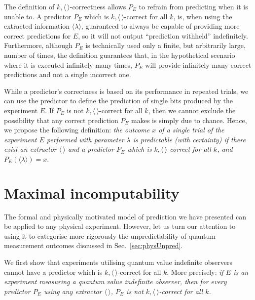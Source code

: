 \documentclass[%
 superscriptaddress,
 preprint,
 showpacs,
 showkeys,
 preprintnumbers,
  amsmath,amssymb,
  aps,
 pra,
  longbibliography,
  floatfix,
 ]{revtex4-1}
\theoremstyle{definition}
\begin{document}
The definition of $k,\langle \, \rangle$-correctness allows $P_E$ to refrain from predicting when it is unable to.
A predictor $P_E$ which is $k,\langle \, \rangle$-correct for all $k$,  is, when using the extracted information $\langle\lambda\rangle$, guaranteed to always be capable of providing more correct predictions for $E$,
so it will not output ``prediction withheld'' indefinitely.
Furthermore, although $P_E$ is technically used only a finite, but arbitrarily large, number of times, the definition guarantees that, in the hypothetical scenario where it is executed infinitely many times, $P_E$ will provide  infinitely many correct predictions and not a single incorrect one.


While a predictor's correctness is based on its performance in repeated trials,  we can use the predictor to define the prediction of single bits produced by the experiment $E$.
If $P_E$ is not $k,\langle \, \rangle$-correct for all $k$, then we cannot exclude the possibility that any correct prediction $P_E$ makes is simply due to chance.
Hence, we propose the following definition: \emph{the outcome $x$ of a single trial of the experiment $E$ performed with parameter $\lambda$ is {\rm predictable} (with certainty) if there exist an extractor $\langle \, \rangle$ and a predictor $P_E$ which is $k,\langle \, \rangle$-correct for all $k$, and $P_E(\langle\lambda\rangle)=x$}.



\section{Maximal incomputability}


The formal and physically motivated model of prediction we have presented can be applied to any physical experiment.
However, let us turn our attention to using it to categorise more rigorously the unpredictability of quantum measurement outcomes discussed in Sec.~\ref{sec:physUnpred}.

We first show that experiments utilising quantum value indefinite observers cannot have a predictor which is $k,\langle \, \rangle$-correct for all $k$.
More precisely: {\em if $E$ is an experiment measuring  a quantum value indefinite observer, then for every predictor $P_E$ using any extractor $\langle\, \rangle$, $P_E$ is not $k,\langle \, \rangle$-correct for all $k$.}
\end{document}
